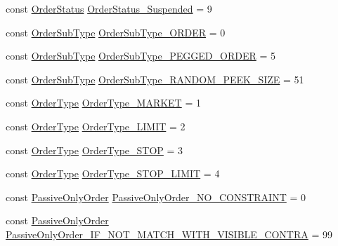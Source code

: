\begin{DoxyCompactItemize}
\item 
const \hyperlink{namespaceMetal_1_1LSE_aaa5d42acc71915dbdbc74bf7b7db958e}{Order\+Status} \hyperlink{namespaceMetal_1_1LSE_a13917e08125f7bd58e34e49edbcb7abc}{Order\+Status\+\_\+\+Suspended} = 9
\item 
const \hyperlink{namespaceMetal_1_1LSE_afd57250a16de7395f5ad2bc63c7b8e5e}{Order\+Sub\+Type} \hyperlink{namespaceMetal_1_1LSE_a1cad1afe3d85e628f3d3eaa526600a3d}{Order\+Sub\+Type\+\_\+\+O\+R\+D\+E\+R} = 0
\item 
const \hyperlink{namespaceMetal_1_1LSE_afd57250a16de7395f5ad2bc63c7b8e5e}{Order\+Sub\+Type} \hyperlink{namespaceMetal_1_1LSE_a588c50b00ae49539a0cf8f40cdd30064}{Order\+Sub\+Type\+\_\+\+P\+E\+G\+G\+E\+D\+\_\+\+O\+R\+D\+E\+R} = 5
\item 
const \hyperlink{namespaceMetal_1_1LSE_afd57250a16de7395f5ad2bc63c7b8e5e}{Order\+Sub\+Type} \hyperlink{namespaceMetal_1_1LSE_a52238bd7fc267f5e8aa228b16060e0db}{Order\+Sub\+Type\+\_\+\+R\+A\+N\+D\+O\+M\+\_\+\+P\+E\+E\+K\+\_\+\+S\+I\+Z\+E} = 51
\item 
const \hyperlink{namespaceMetal_1_1LSE_aff01f13ff9de4cacdd0436f6956df4fb}{Order\+Type} \hyperlink{namespaceMetal_1_1LSE_aedbd348edd17bdad7696cd68635cdb1c}{Order\+Type\+\_\+\+M\+A\+R\+K\+E\+T} = 1
\item 
const \hyperlink{namespaceMetal_1_1LSE_aff01f13ff9de4cacdd0436f6956df4fb}{Order\+Type} \hyperlink{namespaceMetal_1_1LSE_a60f6e325c56bf482cdb16cb907e932fc}{Order\+Type\+\_\+\+L\+I\+M\+I\+T} = 2
\item 
const \hyperlink{namespaceMetal_1_1LSE_aff01f13ff9de4cacdd0436f6956df4fb}{Order\+Type} \hyperlink{namespaceMetal_1_1LSE_a0a91ae7f21459f30131bc3dbf7d78526}{Order\+Type\+\_\+\+S\+T\+O\+P} = 3
\item 
const \hyperlink{namespaceMetal_1_1LSE_aff01f13ff9de4cacdd0436f6956df4fb}{Order\+Type} \hyperlink{namespaceMetal_1_1LSE_ac96e8ca8890880e4a1780fcc2455ff85}{Order\+Type\+\_\+\+S\+T\+O\+P\+\_\+\+L\+I\+M\+I\+T} = 4
\item 
const \hyperlink{namespaceMetal_1_1LSE_afb7bdec752b9048b6d725e2421586a64}{Passive\+Only\+Order} \hyperlink{namespaceMetal_1_1LSE_a4f2d1611cecf6571718f0b50aa45220d}{Passive\+Only\+Order\+\_\+\+N\+O\+\_\+\+C\+O\+N\+S\+T\+R\+A\+I\+N\+T} = 0
\item 
const \hyperlink{namespaceMetal_1_1LSE_afb7bdec752b9048b6d725e2421586a64}{Passive\+Only\+Order} \hyperlink{namespaceMetal_1_1LSE_a4258da20f25351452b2554095a0ee2c8}{Passive\+Only\+Order\+\_\+\+I\+F\+\_\+\+N\+O\+T\+\_\+\+M\+A\+T\+C\+H\+\_\+\+W\+I\+T\+H\+\_\+\+V\+I\+S\+I\+B\+L\+E\+\_\+\+C\+O\+N\+T\+R\+A} = 99

\end{DoxyCompactItemize}
